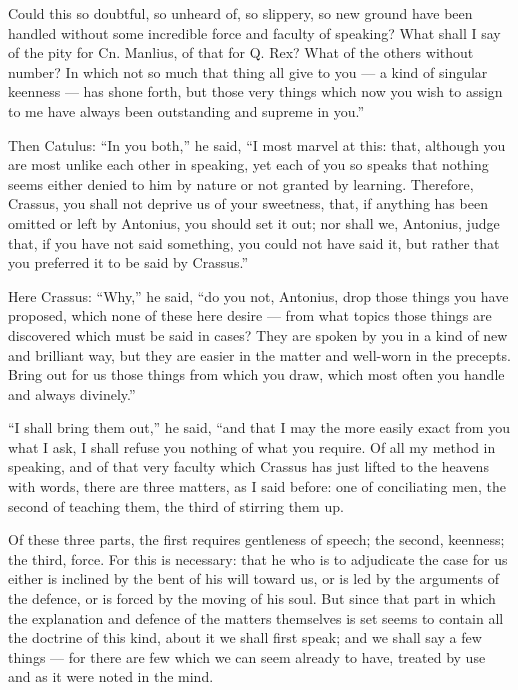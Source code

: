  Could this so doubtful, so unheard of, so slippery, so new ground have been handled without some incredible force and faculty of speaking? What shall I say of the pity for Cn. Manlius, of that for Q. Rex? What of the others without number? In which not so much that thing all give to you — a kind of singular keenness — has shone forth, but those very things which now you wish to assign to me have always been outstanding and supreme in you.''

 Then Catulus: ``In you both,'' he said, ``I most marvel at this: that, although you are most unlike each other in speaking, yet each of you so speaks that nothing seems either denied to him by nature or not granted by learning. Therefore, Crassus, you shall not deprive us of your sweetness, that, if anything has been omitted or left by Antonius, you should set it out; nor shall we, Antonius, judge that, if you have not said something, you could not have said it, but rather that you preferred it to be said by Crassus.''

 Here Crassus: ``Why,'' he said, ``do you not, Antonius, drop those things you have proposed, which none of these here desire — from what topics those things are discovered which must be said in cases? They are spoken by you in a kind of new and brilliant way, but they are easier in the matter and well-worn in the precepts. Bring out for us those things from which you draw, which most often you handle and always divinely.''

 ``I shall bring them out,'' he said, ``and that I may the more easily exact from you what I ask, I shall refuse you nothing of what you require. Of all my method in speaking, and of that very faculty which Crassus has just lifted to the heavens with words, there are three matters, as I said before: one of conciliating men, the second of teaching them, the third of stirring them up.

 Of these three parts, the first requires gentleness of speech; the second, keenness; the third, force. For this is necessary: that he who is to adjudicate the case for us either is inclined by the bent of his will toward us, or is led by the arguments of the defence, or is forced by the moving of his soul. But since that part in which the explanation and defence of the matters themselves is set seems to contain all the doctrine of this kind, about it we shall first speak; and we shall say a few things — for there are few which we can seem already to have, treated by use and as it were noted in the mind.

